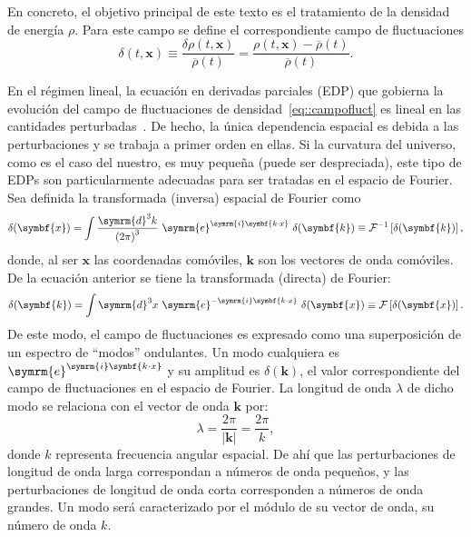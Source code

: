 En concreto, el objetivo principal de este texto es el tratamiento de la densidad de energía \(\rho\). Para este campo se define el correspondiente campo de fluctuaciones
\begin{equation}
    \delta(t,\symbf{x})\equiv\frac{\delta\rho(t,\symbf{x})}{\overbar{\rho}(t)}=\frac{\rho(t,\symbf{x})-\overbar{\rho}(t)}{\overbar{\rho}(t)}.\label{eq::campofluct}
\end{equation}

En el régimen lineal, la ecuación en derivadas parciales (EDP) que gobierna la evolución del campo de fluctuaciones de densidad~\eqref{eq::campofluct} es lineal en las cantidades perturbadas~\cite{mo_van}. De hecho, la única dependencia espacial es debida a las perturbaciones y se trabaja a primer orden en ellas. Si la curvatura del universo, como es el caso del nuestro, es muy pequeña (puede ser despreciada), este tipo de EDPs son particularmente adecuadas para ser tratadas en el espacio de Fourier. Sea definida la transformada (inversa) espacial de Fourier como
\begin{equation}
    \delta(\symbf{x})=\int\frac{\symrm{d}^3 k}{\left(2\pi\right)^3}\ \symrm{e}^{\symrm{i}\symbf{k\cdot x}}\ \delta(\symbf{k})\equiv\mathcal{F}^{-1}\left[\delta(\symbf{k})\right],\label{eq::fourierinverse}
\end{equation}
donde, al ser \(\symbf{x}\) las coordenadas comóviles, \(\symbf{k}\) son los vectores de onda comóviles. De la ecuación anterior se tiene la transformada (directa) de Fourier:
\begin{equation}
    \delta(\symbf{k})=\int\symrm{d}^3 x\ \symrm{e}^{-\symrm{i}\symbf{k\cdot x}}\ \delta(\symbf{x})\equiv\mathcal{F}\left[\delta(\symbf{x})\right].\label{eq::fourier}
\end{equation}
De este modo, el campo de fluctuaciones es expresado como una superposición de un espectro de ``modos'' ondulantes. Un modo cualquiera es \(\symrm{e}^{\symrm{i}\symbf{k\cdot x}}\) y su amplitud es \(\delta(\symbf{k})\), el valor correspondiente del campo de fluctuaciones en el espacio de Fourier. La longitud de onda \(\lambda\) de dicho modo se relaciona con el vector de onda \(\symbf{k}\) por:
\begin{equation}
    \lambda=\frac{2\pi}{\left|\symbf{k}\right|}=\frac{2\pi}{k},
\end{equation}
donde \(k\) representa frecuencia angular espacial. De ahí que las perturbaciones de longitud de onda larga correspondan a números de onda pequeños, y las perturbaciones de longitud de onda corta corresponden a números de onda grandes. Un modo será caracterizado por el módulo de su vector de onda, su número de onda \(k\).

